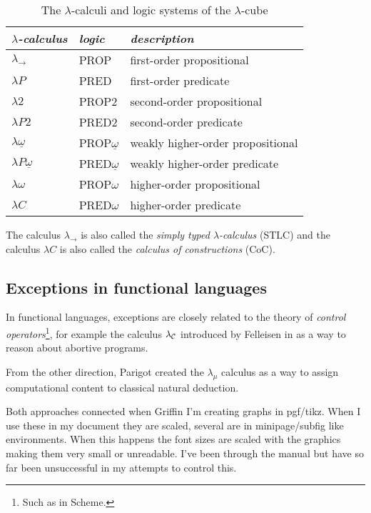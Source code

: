 \begin{table}
\centering
\begin{tabular}{lll}
\toprule
\textit{$\lambda$-calculus} & \textit{logic} & \textit{description} \\
\midrule
$\lambda_\to$ & PROP & first-order propositional \\
$\lambda{}P$ & PRED & first-order predicate \\
$\lambda{}2$ & PROP2 & second-order propositional \\
$\lambda{}P2$ & PRED2 & second-order predicate \\
$\lambda\underline{\omega}$ & PROP$\underline{\omega}$ & weakly higher-order propositional \\
$\lambda{}P\underline{\omega}$& PRED$\underline{\omega}$ & weakly higher-order predicate \\
$\lambda\omega$ & PROP$\omega$ & higher-order propositional \\
$\lambda{}C$ & PRED$\omega$ & higher-order predicate \\
\bottomrule
\end{tabular}

\vspace{8pt}
{\small The calculus $\lambda_\to$ is also called the \emph{simply typed $\lambda$-calculus} (STLC)
and the calculus $\lambda{}C$ is also called the \emph{calculus of constructions} (CoC).}
\caption{The $\lambda$-calculi and logic systems of the $\lambda$-cube \cite{barendregt91}}
\label{tab:lambda-cube}
\end{table}

\subsection{Exceptions in functional languages}

In functional languages, exceptions are closely related to the theory of
\emph{control operators}\footnote{Such as  in Scheme.},
for example the calculus $\lambda_\mathcal{C}$ introduced by Felleisen in \cite{felleisen87}
as a way to reason about abortive programs.

From the other direction, Parigot created the $\lambda_\mu$ calculus \cite{parigot92}
as a way to assign computational content to classical natural deduction.

Both approaches connected when Griffin \cite{griffin90} I'm creating graphs in pgf/tikz. When I use these in my document they are scaled, several are in minipage/subfig like environments. When this happens the font sizes are scaled with the graphics making them very small or unreadable. I've been through the manual but have so far been unsuccessful in my attempts to control this.

